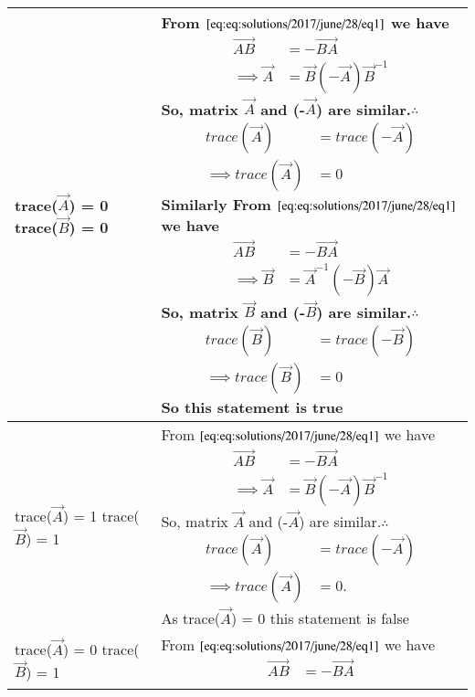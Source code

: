 \begin{table*}[ht!]
\begin{center}
\begin{tabular}{|m{2.2cm}|m{6.3cm}|}\hline
        trace($\vec{A}$) = 0 trace($\vec{B}$) = 0 & From $\eqref{eq:eq:solutions/2017/june/28/eq1}$ we have {\begin{align*}
            \vec{AB} &= -\vec{BA}\\
            \implies\vec{A} &= \vec{B}(-\vec{A})\vec{B}^{-1}
        \end{align*}}So, matrix $\vec{A}$ and (-$\vec{A}$) are similar.$\therefore$ {\begin{align*}
            trace(\vec{A}) &= trace(-\vec{A})\\
            \implies trace(\vec{A}) &= 0
        \end{align*}}Similarly From $\eqref{eq:eq:solutions/2017/june/28/eq1}$ we have {\begin{align*}
            \vec{AB} &= -\vec{BA}\\
            \implies\vec{B} &= \vec{A}^{-1}(-\vec{B})\vec{A}
        \end{align*}}So, matrix $\vec{B}$ and (-$\vec{B}$) are similar.$\therefore$ {\begin{align*}
            trace(\vec{B}) &= trace(-\vec{B})\\
            \implies trace(\vec{B}) &= 0
        \end{align*}} So this statement is true \\
        \hline
        trace($\vec{A}$) = 1 trace($\vec{B}$) = 1 & From $\eqref{eq:eq:solutions/2017/june/28/eq1}$ we have {\begin{align*}
            \vec{AB} &= -\vec{BA}\\
            \implies\vec{A} &= \vec{B}(-\vec{A})\vec{B}^{-1}
        \end{align*}}So, matrix $\vec{A}$ and (-$\vec{A}$) are similar.$\therefore$ {\begin{align*}
            trace(\vec{A}) &= trace(-\vec{A})\\
            \implies trace(\vec{A}) &= 0.
            \end{align*}} As trace($\vec{A}$) = 0 this statement is false\\
        \hline
        trace($\vec{A}$) = 0 trace($\vec{B}$) = 1 & From $\eqref{eq:eq:solutions/2017/june/28/eq1}$ we have {\begin{align*}
            \vec{AB} &= -\vec{BA}\\

\end{align*}}
\end{tabular}
\end{center}
\end{table*}
